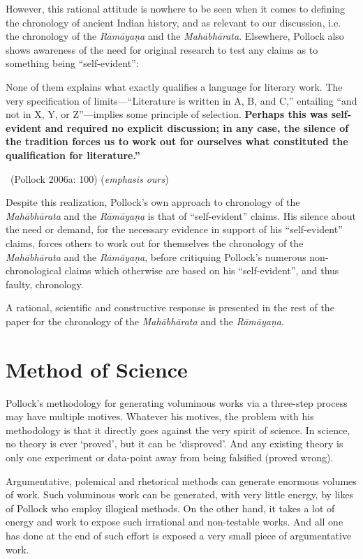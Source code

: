 However, this rational attitude is nowhere to be seen when it comes to defining the chronology of ancient Indian history, and as relevant to our discussion, i.e. the chronology of the \textit{Rāmāyaṇa} and the \textit{Mahābhārata}. Elsewhere, Pollock also shows awareness of the need for original research to test any claims as to something being “self-evident”:

\begin{myquote}
None of them explains what exactly qualiﬁes a language for literary work. The very speciﬁcation of limits—“Literature is written in A, B, and C,” entailing “and not in X, Y, or Z”—implies some principle of selection. \textbf{Perhaps this was self-evident and required no explicit discussion; in any case, the silence of the tradition forces us to work out for ourselves what constituted the qualiﬁcation for literature.”} 

~\hfill (Pollock 2006a: 100) (\textit{emphasis ours})
\end{myquote}

Despite this realization, Pollock’s own approach to chronology of the \textit{Mahābhārata} and the \textit{Rāmāyaṇa} is that of “self-evident” claims. His silence about the need or demand, for the necessary evidence in support of his “self-evident” claims, forces others to work out for themselves the chronology of the \textit{Mahābhārata} and the \textit{Rāmāyaṇa}, before critiquing Pollock’s numerous non-chronological claims which otherwise are based on his “self-evident”, and thus faulty, chronology.

A rational, scientific and constructive response is presented in the rest of the paper for the chronology of the \textit{Mahābhārata} and the \textit{Rāmāyaṇa}.

\vspace{-.3cm}

\section*{Method of Science}

Pollock’s methodology for generating voluminous works via a three-step process may have multiple motives. Whatever his motives, the problem with his methodology is that it directly goes against the very spirit of science. In science, no theory is ever ‘proved’, but it can be ‘disproved’. And any existing theory is only one experiment or data-point away from being falsified (proved wrong).

Argumentative, polemical and rhetorical methods can generate enormous volumes of work. Such voluminous work can be generated, with very little energy, by likes of Pollock who employ illogical methods. On the other hand, it takes a lot of energy and work to expose such irrational and non-testable works. And all one has done at the end of such effort is exposed a very small piece of argumentative work.

